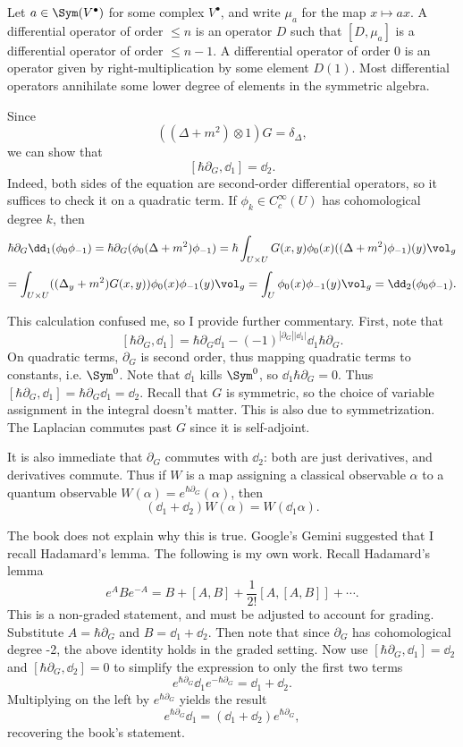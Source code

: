 \begin{remark}
	Let $a\in \Sym (V^{\bullet} )$ for some complex $V^{\bullet} $, and write $\mu_a$ for the map $x\mapsto ax$. A differential operator of order $\leq n$ is an operator $D$ such that $[D,\mu _a]$ is a differential operator of order $\leq n-1$. A differential operator of order 0 is an operator given by right-multiplication by some element $D(1)$. Most differential operators annihilate some lower degree of elements in the symmetric algebra.
\end{remark}


Since
\[
	((\Delta +m^2)\otimes 1)G=\delta _{\Delta } ,
\]
we can show that
\[
	[\hbar \partial _G,\dd _1]=\dd _2
.\]
Indeed, both sides of the equation are second-order differential operators, so it suffices to check it on a quadratic term. If $\phi _k\in C^\infty _c(U)$ has cohomological degree $k$, then
\[
	\hbar \partial _G\dd_1(\phi_0\phi _{-1} )=\hbar \partial _G(\phi _0(\Delta +m^2)\phi _{-1} )=\hbar\int_{U\times U} G(x,y)\phi _0(x)((\Delta +m^2)\phi _{-1} )(y)\vol_{g} 
\]
\[
	=\int_{U\times U} ((\Delta _y + m^2)G(x,y))\phi _0(x)\phi _{-1} (y)\vol_{g} = \int_{U} \phi _0(x)\phi _{-1} (y)\vol_{g} = \dd _2(\phi _0\phi _{-1} )
.\]
\begin{remark}\label{rmk:4-6-3}
	This calculation confused me, so I provide further commentary. First, note that
	\[
		[\hbar \partial _G,\dd _1] = \hbar \partial _G\dd _1 - (-1)^{\left| \partial _G \right| \left| \dd _1 \right| } \dd_1 \hbar \partial _G
	.\]
	On quadratic terms, $\partial _G$ is second order, thus mapping quadratic terms to constants, i.e. $\Sym ^0$. Note that $\dd _1$ kills $\Sym ^0$, so $\dd_1 \hbar \partial _G=0$. Thus $[\hbar \partial _G,\dd _1]=\hbar \partial _G\dd _1=\dd _2$. Recall that $G$ is symmetric, so the choice of variable assignment in the integral doesn't matter. This is also due to symmetrization. The Laplacian commutes past $G$ since it is self-adjoint.
\end{remark}

It is also immediate that $\partial _G$ commutes with $\dd _2$: both are just derivatives, and derivatives commute. Thus if $W$ is a map assigning a classical observable $\alpha $ to a quantum observable $W(\alpha )=e^{\hbar \partial _G} (\alpha )$, then
\[
	(\dd _1 + \dd _2)W(\alpha ) = W(\dd _1\alpha )
.\]

The book does not explain why this is true. Google's Gemini suggested that I recall Hadamard's lemma. The following is my own work. Recall Hadamard's lemma
\[
	e^ABe^{-A} =B + [A,B] + \frac{1}{2!} [A,[A,B]] + \cdots 
.\]
This is a non-graded statement, and must be adjusted to account for grading. Substitute $A=\hbar \partial _G$ and $B=\dd_1+\dd _2$. Then note that since $\partial _G$ has cohomological degree -2, the above identity holds in the graded setting. Now use $[\hbar \partial _G,\dd _1]=\dd _2$ and $[\hbar \partial _G,\dd _2]=0$ to simplify the expression to only the first two terms
\[
	e^{\hbar \partial _G} \dd _1 e^{-\hbar \partial _G} = \dd _1 + \dd _2
.\]
Multiplying on the left by $e^{\hbar \partial _G} $ yields the result
\[
	e^{\hbar \partial _G} \dd _1 = \left( \dd _1 + \dd _2 \right) e^{\hbar \partial _G} 
,\]
recovering the book's statement. 

